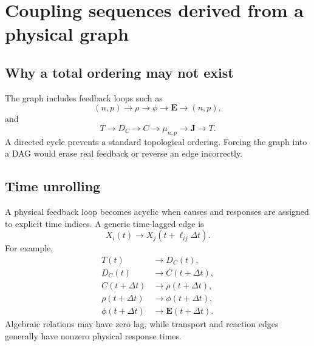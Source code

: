 \documentclass[11pt]{article}
\newcommand{\Evec}{\bm{E}}
\newcommand{\Jvec}{\bm{J}}
\newcommand{\dt}{\Delta t}
\begin{document}
\section{Coupling sequences derived from a physical graph}

\subsection{Why a total ordering may not exist}

The graph includes feedback loops such as
\begin{equation}
(n,p)\rightarrow\rho\rightarrow\phi\rightarrow\Evec\rightarrow(n,p),
\end{equation}
and
\begin{equation}
T\rightarrow D_C\rightarrow C\rightarrow\mu_{n,p}\rightarrow\Jvec\rightarrow T.
\end{equation}
A directed cycle prevents a standard topological ordering. Forcing the graph into a DAG would erase real feedback or reverse an edge incorrectly.

\subsection{Time unrolling}

A physical feedback loop becomes acyclic when causes and responses are assigned to explicit time indices. A generic time-lagged edge is
\begin{equation}
X_i(t)\rightarrow X_j(t+\ell_{ij}\dt).
\end{equation}
For example,
\begin{align}
T(t)&\rightarrow D_C(t),\\
D_C(t)&\rightarrow C(t+\dt),\\
C(t+\dt)&\rightarrow\rho(t+\dt),\\
\rho(t+\dt)&\rightarrow\phi(t+\dt),\\
\phi(t+\dt)&\rightarrow\Evec(t+\dt).
\end{align}
Algebraic relations may have zero lag, while transport and reaction edges generally have nonzero physical response times.
\end{document}
